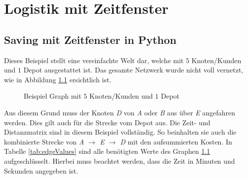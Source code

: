 \chapter{Logistik mit Zeitfenster}
\label{Logistik mit Zeitfenster}

\section{Saving mit Zeitfenster in Python}

Dieses Beispiel stellt eine vereinfachte Welt dar, welche mit $5$ Knoten/Kunden und $1$ Depot ausgestattet ist. 
Das gesamte Netzwerk wurde nicht voll vernetzt, wie in Abbildung \ref{fig:exampleNetzwerk} ersichtlich ist. 
\begin{figure}
\centering
{}

	\caption{Beispiel Graph mit $5$ Knoten/Kunden und $1$ Depot}
	\label{fig:exampleNetzwerk}
\end{figure}
Aus diesem Grund muss der Knoten \textit{D} von \textit{A} oder \textit{B} aus über \textit{E} angefahren werden. 
Dies gilt auch für die Strecke vom Depot aus. 
Die Zeit- und Distanzmatrix sind in diesem Beispiel vollständig. 
So beinhalten sie auch die kombinierte Strecke von \textit{A $\rightarrow$ E $\rightarrow$ D} mit den aufsummierten Kosten. 
In Tabelle \ref{tab:edgeValues} sind alle benötigten Werte des Graphen \ref{fig:exampleNetzwerk} aufgeschlüsselt. 
Hierbei muss beachtet werden, dass die Zeit in Minuten und Sekunden angegeben ist. 
